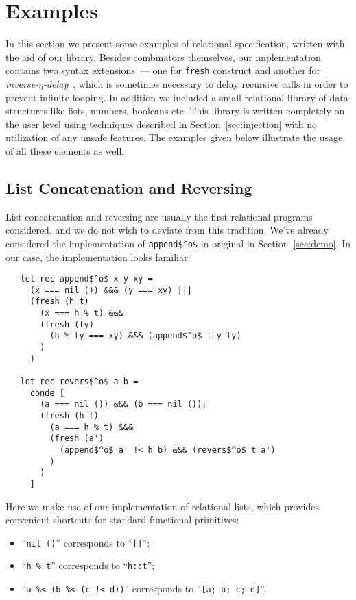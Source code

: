 \section{Examples}
\label{sec:examples}

In this section we present some examples of relational specification, written with the aid of our library.
Besides \miniKanren combinators themselves, our implementation contains two syntax extensions~--- one
for \lstinline{fresh} construct and another for \emph{inverse-$\eta$-delay}~\cite{MicroKanren}, which is
sometimes necessary to delay recursive calls in order to prevent infinite looping. In addition we included a
small relational library of data structures like lists, numbers, booleans etc. This library is written
completely on the user level using techniques described in Section~\ref{sec:injection} with no utilization
of any unsafe features. The examples given below illustrate the usage of all these elements as well.

\subsection{List Concatenation and Reversing}

List concatenation and reversing are usually the first relational programs considered, and we do not wish
to deviate from this tradition. We've already considered the implementation of \lstinline{append$^o$} in
original \miniKanren in Section~\ref{sec:demo}. In our case, the implementation looks familiar:

\begin{lstlisting}
   let rec append$^o$ x y xy =
     (x === nil ()) &&& (y === xy) |||
     (fresh (h t)
       (x === h % t) &&&
       (fresh (ty)
         (h % ty === xy) &&& (append$^o$ t y ty)
       )
     )

   let rec revers$^o$ a b =
     conde [
       (a === nil ()) &&& (b === nil ());
       (fresh (h t)
         (a === h % t) &&&
         (fresh (a')
           (append$^o$ a' !< h b) &&& (revers$^o$ t a')
         )
       )
     ]
\end{lstlisting}

Here we make use of our implementation of relational lists, which provides convenient shortcuts for
standard functional primitives:

\begin{itemize}
  \item ``\lstinline{nil ()}'' corresponds to ``\lstinline{[]}'';
  \item ``\lstinline{h % t}'' corresponds to ``\lstinline{h::t}'';
  \item ``\lstinline{a %< (b %< (c !< d))}'' corresponds to ``\lstinline{[a; b; c; d]}''.
\end{itemize}

